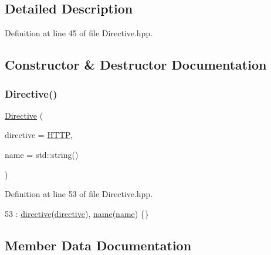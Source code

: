 \subsection{Detailed Description}


Definition at line 45 of file Directive.\+hpp.



\subsection{Constructor \& Destructor Documentation}
\mbox{\label{classft_1_1_directive_aedcc052461811957b6a8610e0c72968d}} 
\subsubsection{\texorpdfstring{Directive()}{Directive()}}
{\footnotesize\ttfamily \hyperlink{classft_1_1_directive}{Directive} (\begin{DoxyParamCaption}\item[{enum \hyperlink{namespaceft_a5a5554dff10f0dc50bae4cc5825ad75d}{Directive\+Kind}}]{directive = {\ttfamily \hyperlink{namespaceft_a5a5554dff10f0dc50bae4cc5825ad75da67e044074f46e6cea22788527da5f02e}{H\+T\+TP}},  }\item[{const std\+::string \&}]{name = {\ttfamily std\+:\+:string()} }\end{DoxyParamCaption})\hspace{0.3cm}{\ttfamily [inline]}}



Definition at line 53 of file Directive.\+hpp.


\begin{DoxyCode}
53 : \hyperlink{classft_1_1_directive_ad974f853279afa5ad30a28773b94fe87}{directive}(\hyperlink{classft_1_1_directive_ad974f853279afa5ad30a28773b94fe87}{directive}), \hyperlink{classft_1_1_directive_a9b45b3e13bd9167aab02e17e08916231}{name}(\hyperlink{classft_1_1_directive_a9b45b3e13bd9167aab02e17e08916231}{name}) \{\}
\end{DoxyCode}


\subsection{Member Data Documentation}
\mbox{\label{classft_1_1_directive_ad974f853279afa5ad30a28773b94fe87}} 

